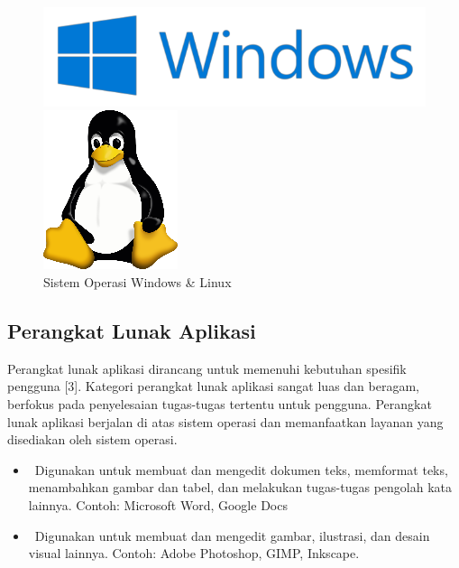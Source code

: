 \begin{figure}[!htb]
	\begin{minipage}{0.52\textwidth}
		\centering
		\includegraphics[width=0.8\linewidth]
		{assets/pics/windows.png}
	\end{minipage}\hfill
	\begin{minipage}{0.38\textwidth}
		\includegraphics[width=0.4\linewidth]
		{assets/pics/linux.png}
	\end{minipage}
	\caption{Sistem Operasi Windows \& Linux}
\end{figure}

\subsection{Perangkat Lunak Aplikasi}
Perangkat lunak aplikasi dirancang untuk memenuhi kebutuhan spesifik pengguna [3]. Kategori perangkat lunak aplikasi sangat luas dan beragam, berfokus pada penyelesaian tugas-tugas tertentu untuk pengguna. Perangkat lunak aplikasi berjalan di atas sistem operasi dan memanfaatkan layanan yang disediakan oleh sistem operasi.

\begin{itemize}

	\item {} Digunakan untuk membuat dan mengedit dokumen teks, memformat teks, menambahkan gambar dan tabel, dan melakukan tugas-tugas pengolah kata lainnya. Contoh: Microsoft Word, Google Docs
	\item {} Digunakan untuk membuat dan mengedit gambar, ilustrasi, dan desain visual lainnya. Contoh: Adobe Photoshop, GIMP, Inkscape.

\end{itemize}


